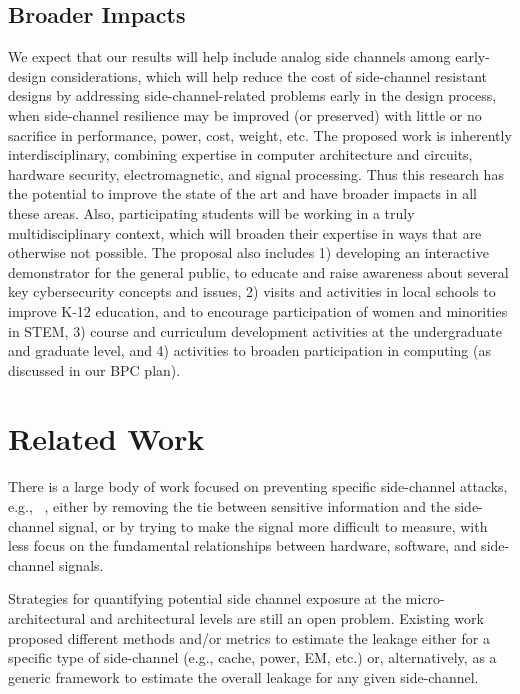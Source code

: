 \documentclass[11 pt]{article}
\begin{document}
\subsection{Broader Impacts}
We expect that our results will help include analog side channels among early-design considerations, which will help reduce the cost of side-channel resistant designs by addressing side-channel-related problems early in the design process, when side-channel resilience may be improved (or preserved) with little or no sacrifice in performance, power, cost, weight, etc. The proposed work is inherently interdisciplinary, combining expertise in computer architecture and circuits, hardware security, electromagnetic, and signal processing. Thus this research has the potential to improve the state of the art and have broader impacts in all these areas. Also, participating students will be working in a truly multidisciplinary context, which will broaden their expertise in ways that are otherwise not possible. The proposal also includes 1) developing an interactive demonstrator for the general public, to educate and raise awareness about several key cybersecurity concepts and issues, 2) visits and activities in local schools to improve K-12 education, and to  encourage participation of women and minorities in STEM, 3) course and curriculum development activities at the undergraduate and graduate level, and 4) activities to broaden participation in computing (as discussed in our BPC plan).
\section{Related Work}
There is a large body of work focused on preventing specific side-channel attacks, e.g., ~\cite{Backes:2010:ASA:1929820.1929847,Nazari:2017:EED:3079856.3080223,Demme:2013:FOM:2485922.2485970,Han:2017:WMB:3133956.3134081,Liu:2016:CET:2976749.2978299,6987331,He:2017:SYC:3123939.3124546,217605,Monjur21}, either by removing the tie between sensitive information and the side-channel signal, or by
trying to make the signal more difficult to measure, with less focus on the fundamental relationships between hardware, software, and side-channel signals.

Strategies for quantifying potential side channel exposure at the micro-architectural and architectural levels are still
an open problem. Existing work proposed different methods and/or metrics to estimate the leakage either for a specific type of side-channel (e.g., cache, power, EM, etc.) or, alternatively, as a generic framework to estimate the overall leakage for any given side-channel.
\end{document}
